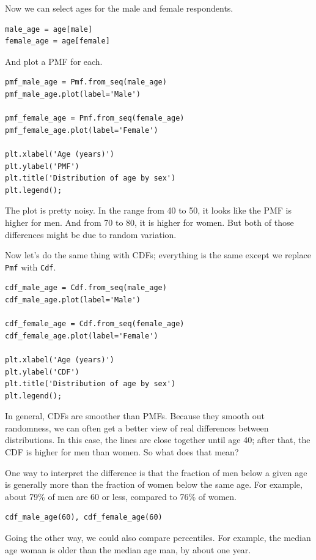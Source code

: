Now we can select ages for the male and female respondents.

\begin{lstlisting}[]
male_age = age[male]
female_age = age[female]
\end{lstlisting}

And plot a PMF for each.

\begin{lstlisting}[]
pmf_male_age = Pmf.from_seq(male_age)
pmf_male_age.plot(label='Male')

pmf_female_age = Pmf.from_seq(female_age)
pmf_female_age.plot(label='Female')

plt.xlabel('Age (years)') 
plt.ylabel('PMF')
plt.title('Distribution of age by sex')
plt.legend();
\end{lstlisting}

The plot is pretty noisy. In the range from 40 to 50, it looks like the
PMF is higher for men. And from 70 to 80, it is higher for women. But
both of those differences might be due to random variation.

Now let's do the same thing with CDFs; everything is the same except we
replace \passthrough{\lstinline!Pmf!} with
\passthrough{\lstinline!Cdf!}.

\begin{lstlisting}[]
cdf_male_age = Cdf.from_seq(male_age)
cdf_male_age.plot(label='Male')

cdf_female_age = Cdf.from_seq(female_age)
cdf_female_age.plot(label='Female')

plt.xlabel('Age (years)') 
plt.ylabel('CDF')
plt.title('Distribution of age by sex')
plt.legend();
\end{lstlisting}

In general, CDFs are smoother than PMFs. Because they smooth out
randomness, we can often get a better view of real differences between
distributions. In this case, the lines are close together until age 40;
after that, the CDF is higher for men than women. So what does that
mean?

One way to interpret the difference is that the fraction of men below a
given age is generally more than the fraction of women below the same
age. For example, about 79\% of men are 60 or less, compared to 76\% of
women.

\begin{lstlisting}[]
cdf_male_age(60), cdf_female_age(60)
\end{lstlisting}

Going the other way, we could also compare percentiles. For example, the
median age woman is older than the median age man, by about one year.

